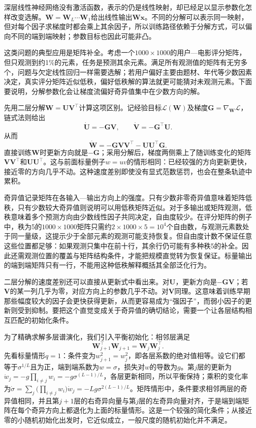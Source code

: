 深层线性神经网络没有激活函数，表示的仍是线性映射，却已经足以显示参数化怎样改变选解。$\bm W=\bm W_L\cdots\bm W_1$给出线性输出$\bm W\bm x$。不同的分解可以表示同一映射，但对每个因子求梯度时都会乘上其余因子，所以训练路径依赖于分解方式，可以偏向不同的端到端映射；参数目标也因此可能非凸。

这类问题的典型应用是矩阵补全。考虑一个$1000\times1000$的用户—电影评分矩阵，但只观测到约1\%的元素，任务是预测其余元素。满足所有观测值的矩阵有无穷多个，问题与欠定线性回归一样需要选解；若用户偏好主要由题材、年代等少数因素决定，真实评分矩阵近似低秩，偏好低秩解的算法就更可能猜对未观测元素。下面要说明，分解参数化会让梯度流偏好奇异值集中在少数方向的解。

先用二层分解$\bm W=\bm U\bm V^\top$计算这项区别。记经验目标$\mathcal L(\bm W)$及梯度$\bm G=\nabla_{\bm W}\mathcal L$，链式法则给出
\[
 \dot{\bm U}=-\bm G\bm V,\qquad
 \dot{\bm V}=-\bm G^\top\bm U.
\]
从而
\begin{equation}
 \dot{\bm W}=-\bm G\bm V\bm V^\top-\bm U\bm U^\top\bm G.
 \label{eq:factorized-gradient-flow}
\end{equation}
直接训练$\bm W$时更新方向就是$-\bm G$；采用分解后，梯度两侧乘上了随训练变化的矩阵$\bm V\bm V^\top$和$\bm U\bm U^\top$。这与前面标量例子$w=uv$的情形相同：已经较强的方向更新更快，接近零的方向几乎不动。这种速度差别即使没有显式范数惩罚，也会在整条轨迹中累积。

奇异值记录矩阵在各输入—输出方向上的强度。只有少数非零奇异值意味着矩阵低秩，只有少数较大奇异值则说明可以用低秩矩阵近似。对于多输出或矩阵观测，低秩意味着多个预测方向由少数线性因子共同决定，自由度较少。在评分矩阵的例子中，秩为5的$1000\times1000$矩阵只需约$2\times1000\times5=10^4$个自由数，与观测元素数处于同一量级，这提示少于全部元素的观测可能支持恢复。但自由度计数不保证任意这些位置都足够：如果观测只集中在前十行，其余行仍可能有多种秩5的补全。因此还需观测位置的覆盖与矩阵结构条件，才能把规模直觉转为恢复保证。标量输出的端到端矩阵只有一行，不能用这种低秩解释概括其全部泛化行为。

二层分解的速度差别还可以直接从更新式中看出来。对$\bm U$，更新方向是$-\bm G\bm V$；若$\bm V$的某一列几乎为零，对应方向上的参数几乎不动。对$\bm V$同理。这意味着训练早期那些幅度较大的因子会更快获得更新，从而更容易成为“强因子”，而弱小因子的更新则受到抑制。要把这个直觉变成关于奇异值的确切结论，需要一个让各层结构相互匹配的初始化条件。

为了精确求解多层谱演化，我们引入平衡初始化：相邻层满足
\[
 \bm W_{j+1}^\top\bm W_{j+1}=\bm W_j\bm W_j^\top.
\]
先看标量情形$q=1$：条件变为$w_{j+1}^2=w_j^2$，即各层系数的绝对值相等。设它们都等于$\sigma^{1/L}$且为正，端到端系数为$w=\sigma$，损失对$w$的导数为$g$。第$j$层的更新为$\dot w_j=-g\prod_{i\neq j}w_i=-g\sigma^{(L-1)/L}$，各层更新相同，所以平衡保持；乘积的变化率为$\dot\sigma=\sum_j\bigl(\prod_{i\neq j}w_i\bigr)\dot w_j=-Lg\sigma^{2(L-1)/L}$。矩阵情形中，条件要求相邻两层的奇异值相同，并且第$j+1$层的右奇异向量与第$j$层的左奇异向量对齐，于是端到端矩阵在每个奇异方向上都退化为上面的标量情形。这是一个较强的简化条件；从接近零的小随机初始化出发时，它近似成立，一般尺度的随机初始化并不满足。

